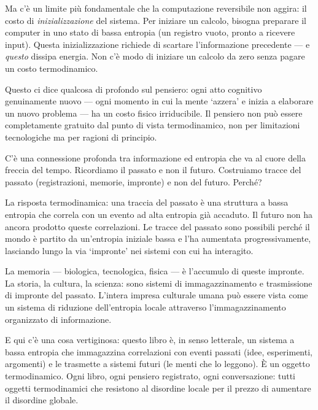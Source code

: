 \documentclass[12pt,a4paper,openany]{book}
\newcommand{\sezione}[1]{\vspace{1.2em}{\large\bfseries #1}\vspace{0.5em}\par}
\begin{document}
Ma c'è un limite più fondamentale che la computazione reversibile non aggira: il costo di \textit{inizializzazione} del sistema. Per iniziare un calcolo, bisogna preparare il computer in uno stato di bassa entropia (un registro vuoto, pronto a ricevere input). Questa inizializzazione richiede di scartare l'informazione precedente --- e \textit{questo} dissipa energia. Non c'è modo di iniziare un calcolo da zero senza pagare un costo termodinamico.

Questo ci dice qualcosa di profondo sul pensiero: ogni atto cognitivo genuinamente nuovo --- ogni momento in cui la mente `azzera' e inizia a elaborare un nuovo problema --- ha un costo fisico irriducibile. Il pensiero non può essere completamente gratuito dal punto di vista termodinamico, non per limitazioni tecnologiche ma per ragioni di principio.

\sezione{Informazione, entropia e la freccia del tempo}

C'è una connessione profonda tra informazione ed entropia che va al cuore della freccia del tempo. Ricordiamo il passato e non il futuro. Costruiamo tracce del passato (registrazioni, memorie, impronte) e non del futuro. Perché?

La risposta termodinamica: una traccia del passato è una struttura a bassa entropia che correla con un evento ad alta entropia già accaduto. Il futuro non ha ancora prodotto queste correlazioni. Le tracce del passato sono possibili perché il mondo è partito da un'entropia iniziale bassa e l'ha aumentata progressivamente, lasciando lungo la via `impronte' nei sistemi con cui ha interagito.

La memoria --- biologica, tecnologica, fisica --- è l'accumulo di queste impronte. La storia, la cultura, la scienza: sono sistemi di immagazzinamento e trasmissione di impronte del passato. L'intera impresa culturale umana può essere vista come un sistema di riduzione dell'entropia locale attraverso l'immagazzinamento organizzato di informazione.

E qui c'è una cosa vertiginosa: questo libro è, in senso letterale, un sistema a bassa entropia che immagazzina correlazioni con eventi passati (idee, esperimenti, argomenti) e le trasmette a sistemi futuri (le menti che lo leggono). È un oggetto termodinamico. Ogni libro, ogni pensiero registrato, ogni conversazione: tutti oggetti termodinamici che resistono al disordine locale per il prezzo di aumentare il disordine globale.

\sezione{Computazione, fisica e i limiti della mente artificiale}
\end{document}

